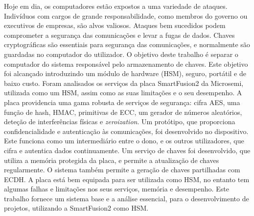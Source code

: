 \noindent Hoje em dia, os computadores estão expostos a uma variedade de ataques. Indivíduos com cargos de grande responsabilidade, como membros do governo ou executivos de empresas, são alvos valiosos. Ataques bem sucedidos podem comprometer a segurança das comunicações e levar a fugas de dados. Chaves cryptográficas são essentiais para segurança das comunicações, e normalmente são guardadas no computador do utilizador. O objetivo deste trabalho é separar o computador do sistema responsável pelo armazenamento de chaves. Este objetivo foi alcançado introduzindo um módulo de hardware (HSM), seguro, portátil e de baixo custo. Foram analisados os serviços da placa SmartFusion2 da Microsemi, utilizada como um HSM, assim como as suas limitações e o seu desempenho. A placa providencia uma gama robusta de serviços de segurança: cifra AES, uma função de hash, HMAC, primitivas de ECC, um gerador de números aleatórios, deteção de interferências físicas e \textit{zeroization}. Um protótipo, que proporciona confidencialidade e autenticação às comunicações, foi desenvolvido no dispositivo. Este funciona como um intermediário entre o dono, e os outros utilizadores, que cifra e autentica dados continuamente. Um serviço de chaves foi desenvolvido, que utiliza a memória protegida da placa, e permite a atualização de chaves regularmente. O sistema também permite a geração de chaves partilhadas com ECDH. A placa está bem equipada para ser utilizada como HSM, no entanto tem algumas falhas e limitações nos seus serviços, memória e desempenho. Este trabalho fornece um sistema base e a análise essencial, para o desenvolvimento de projetos, utilizando a SmartFusion2 como HSM.
